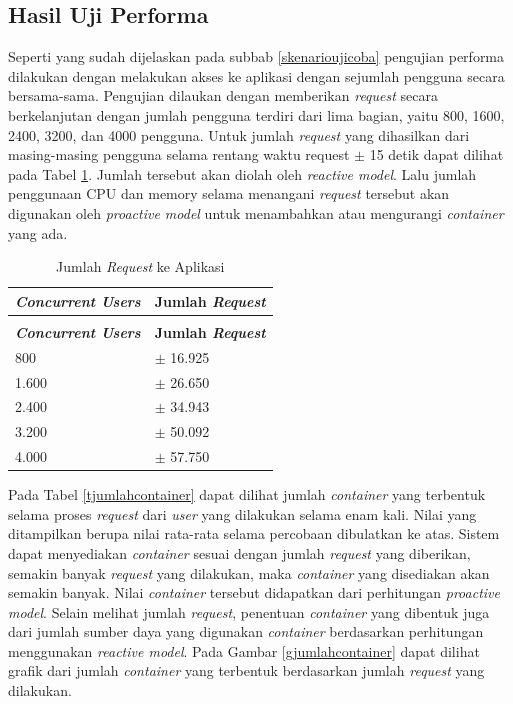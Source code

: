     \subsection{Hasil Uji Performa}
    	Seperti yang sudah dijelaskan pada subbab \ref{skenarioujicoba} pengujian performa dilakukan dengan melakukan akses ke aplikasi dengan sejumlah pengguna secara bersama-sama. Pengujian dilaukan dengan memberikan \textit{request} secara berkelanjutan dengan jumlah pengguna terdiri dari lima bagian, yaitu 800, 1600, 2400, 3200, dan 4000 pengguna. Untuk jumlah \textit{request} yang dihasilkan dari masing-masing pengguna selama rentang waktu request $\pm$ 15 detik dapat dilihat pada Tabel \ref{trequest}. Jumlah tersebut akan diolah oleh \textit{reactive model}. Lalu jumlah penggunaan CPU dan memory selama menangani \textit{request} tersebut akan digunakan oleh \textit{proactive model} untuk menambahkan atau mengurangi \textit{container} yang ada.
        \begin{longtable}{|p{}|p{}|}
        \caption{Jumlah \textit{Request} ke Aplikasi} \label{trequest} \\
            \hline
            \textbf{\textit{Concurrent Users}} & \textbf{Jumlah \textit{Request}} \\ \hline
            \endfirsthead
            \caption[]{Jumlah \textit{Request} ke Aplikasi} \\
            \hline
            \textbf{\textit{Concurrent Users}} & \textbf{Jumlah \textit{Request}} \\ \hline
            \endhead
            \endfoot
            \endlastfoot
            
            800 & $\pm$ 16.925 \\ \hline
            1.600 & $\pm$ 26.650 \\ \hline
            2.400 & $\pm$ 34.943 \\ \hline
            3.200 & $\pm$ 50.092 \\ \hline
            4.000 & $\pm$ 57.750 \\ \hline
					
		\end{longtable}
        
        Pada Tabel \ref{tjumlahcontainer} dapat dilihat jumlah \textit{container} yang terbentuk selama proses \textit{request} dari \textit{user} yang dilakukan selama enam kali. Nilai yang ditampilkan berupa nilai rata-rata selama percobaan dibulatkan ke atas. Sistem dapat menyediakan \textit{container} sesuai dengan jumlah \textit{request} yang diberikan, semakin banyak \textit{request} yang dilakukan, maka \textit{container} yang disediakan akan semakin banyak. Nilai \textit{container} tersebut didapatkan dari perhitungan \textit{proactive model}. Selain melihat jumlah \textit{request}, penentuan \textit{container} yang dibentuk juga dari jumlah sumber daya yang digunakan \textit{container} berdasarkan perhitungan menggunakan \textit{reactive model}. Pada Gambar \ref{gjumlahcontainer} dapat dilihat grafik dari jumlah \textit{container} yang terbentuk berdasarkan jumlah \textit{request} yang dilakukan.
        
